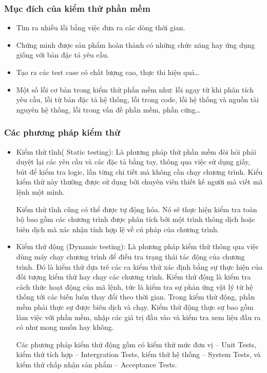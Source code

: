 	\subsubsection{Mục đích của kiểm thử phần mềm}
	\begin{itemize}
		\item Tìm ra nhiều lỗi bằng việc đưa ra các dòng thời gian.
		\item Chứng minh được sản phẩm hoàn thành có những chức năng hay ứng dụng giống với bản đặc tả yêu cầu.
		\item Tạo ra các test case có chất lượng cao, thực thi hiệu quả…
		\item Một số lỗi cơ bản trong kiểm thử phần mềm như: lỗi ngay từ khi phân tích yêu cầu, lỗi từ bản đặc tả hệ thống, lỗi trong code, lỗi hệ thống và nguồn tài nguyên hệ thống, lỗi trong vấn đề phần mềm, phần cứng…		
	\end{itemize}

	\subsubsection{Các phương pháp kiểm thử}
	\begin{itemize}
		\item Kiểm thử tĩnh( Static testing): Là phương pháp thử phần mềm đòi hỏi phải duyệt lại các yêu cầu và các đặc tả bằng tay, thông qua việc sử dụng giấy, bút để kiểm tra logic, lần từng chi tiết mà không cần chạy chương trình. Kiểu kiểm thử này thường được sử dụng bởi chuyên viên thiết kế người mà viết mã lệnh một mình.
		
		Kiểm thử tĩnh cũng có thể được tự động hóa. Nó sẽ thực hiện kiểm tra toàn bộ bao gồm các chương trình được phân tích bởi một trình thông dịch hoặc biên dịch mà xác nhận tính hợp lệ về cú pháp của chương trình.
		
		\item Kiểm thử động (Dynamic testing): Là phương pháp kiểm thử thông qua việc dùng máy chạy chương trình để điều tra trạng thái tác động của chương trình. Đó là kiểm thử dựa trê các ca kiểm thử xác định bằng sự thực hiện của đối tượng kiểm thử hay chạy các chương trình. Kiểm thử động là kiểm tra cách thức hoạt động của mã lệnh, tức là kiểm tra sự phản ứng vật lý từ hệ thống tới các biến luôn thay đổi theo thời gian. Trong kiểm thử động, phần mềm phải thực sự được biên dịch và chạy. Kiểm thử động thực sự bao gồm làm việc với phần mềm, nhập các giá trị đầu vào và kiểm tra xem liệu đầu ra có như mong muốn hay không.
		
		Các phương pháp kiểm thử động gồm có kiểm thử mức đơn vị – Unit Tests, kiểm thử tích hợp – Intergration Tests, kiểm thử hệ thống – System Tests, và kiểm thử chấp nhận sản phẩm – Acceptance Tests.		
	\end{itemize}

